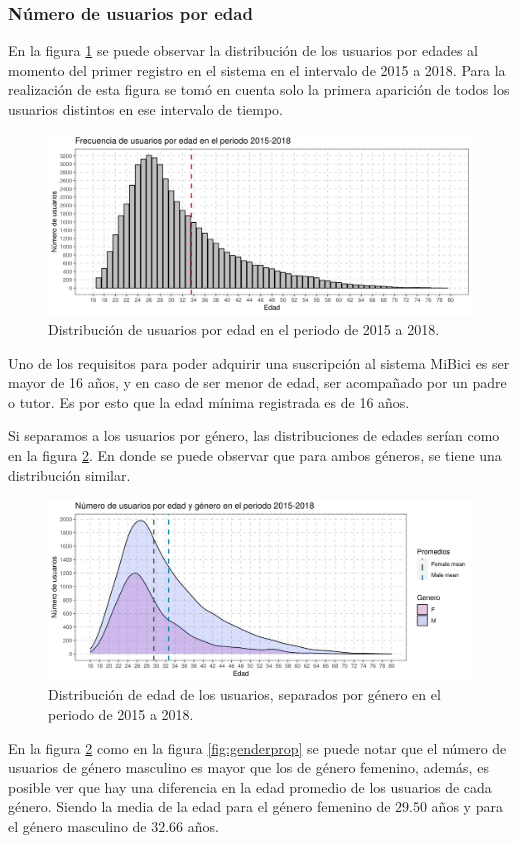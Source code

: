 \subsubsection*{Número de usuarios por edad}
En la figura \ref{fig:agedistribution} se puede observar la distribución de los usuarios por edades al momento del primer registro en el sistema en el intervalo de 2015 a 2018. Para la realización de esta figura se tomó en cuenta solo la primera aparición de todos los usuarios distintos en ese intervalo de tiempo.
\begin{figure}[H]
	\centering
	\includegraphics[width=14cm]{Graphics/age_distribution}
	\caption{Distribución de usuarios por edad en el periodo de 2015 a 2018.}
	\label{fig:agedistribution}
\end{figure}

Uno de los requisitos para poder adquirir una suscripción al sistema MiBici es ser mayor de 16 años, y en caso de ser menor de edad, ser acompañado por un padre o tutor. Es por esto que la edad mínima registrada es de 16 años.
\par Si separamos a los usuarios por género, las distribuciones de edades serían como en la figura \ref{fig:agegenderdistribution}. En donde se puede observar que para ambos géneros, se tiene una distribución similar.
\begin{figure}[H]
	\centering
	\includegraphics[width=14cm]{Graphics/age_gender_distribution}
	\caption{Distribución de edad de los usuarios, separados por género en el periodo de 2015 a 2018.}
	\label{fig:agegenderdistribution}
\end{figure}
En la figura \ref{fig:agegenderdistribution} como en la figura \ref{fig:genderprop} se puede notar que el número de usuarios de género masculino es mayor que los de género femenino, además, es posible ver que hay una diferencia en la edad promedio de los usuarios de cada género. Siendo la media de la edad para el género femenino de $29.50$ años y para el género masculino de $32.66$ años.